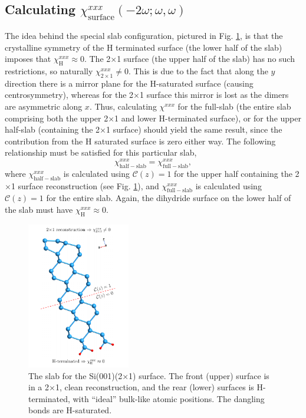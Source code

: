 
\subsection{Calculating 
\texorpdfstring{$\chi^{xxx}_{\mathrm{surface}}(-2\omega;\omega,\omega)$}{Xxxx}}
\label{sec:res2x1chi}

The idea behind the special slab configuration, pictured in Fig.
\ref{fig:si2x1slab}, is that the crystalline symmetry of the H terminated
surface (the lower half of the slab) imposes that
$\chi_{\mathrm{H}}^{xxx}\approx 0$. The 2$\times$1 surface (the upper half of
the slab) has no such restrictions, so naturally $\chi_{2\times 1}^{xxx}\ne 0$.
This is due to the fact that along the $y$ direction there is a mirror plane for
the H-saturated surface (causing centrosymmetry), whereas for the 2$\times$1
surface this mirror is lost as the dimers are asymmetric along $x$. Thus,
calculating $\chi^{xxx}$ for the full-slab (the entire slab comprising both the
upper 2$\times$1 and lower H-terminated surface), or for the upper half-slab
(containing the 2$\times$1 surface) \cite{note1} should yield the same result,
since the contribution from the H saturated surface is zero either way. The
following relationship must be satisfied for this particular slab,
\begin{equation*}
\chi_{\mathrm{half-slab}}^{xxx} =
\chi_{\mathrm{full-slab}}^{xxx},
\end{equation*}
where $\chi_{\mathrm{half-slab}}^{xxx}$ is calculated using
${\mathbf{\mathcal{C}}}(z) = 1$ for the upper half containing the 2$\times$1
surface reconstruction (see Fig. \ref{fig:si2x1slab}), and
$\chi_{\mathrm{full-slab}}^{xxx}$ is calculated using ${\mathbf{\mathcal{C}}}(z)
= 1$ for the entire slab. Again, the dihydride surface on the lower half of the
slab must have $\chi_{\mathrm{H}}^{xxx} \approx 0$.

\begin{figure}[h]
\centering 
\includegraphics[width=0.4\textwidth]{content/figures/struc-Si2x1-rot}
\caption[The slab for the Si(001)(2$\times$1) surface.]
{The slab for the Si(001)(2$\times$1) surface. The front (upper) surface
is in a 2$\times$1, clean reconstruction, and the rear (lower) surfaces is
H-terminated, with ``ideal'' bulk-like atomic positions. The dangling bonds are
H-saturated.}
\label{fig:si2x1slab}
\end{figure} 



